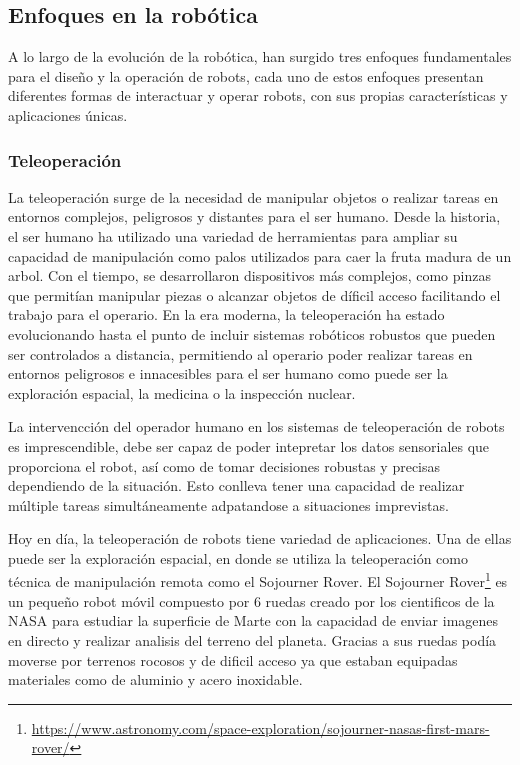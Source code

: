  \subsection{Enfoques en la robótica}
 \label{sec:enfoquesrobotica}
A lo largo de la evolución de la robótica, han surgido tres enfoques fundamentales para el diseño y la operación de robots, cada uno de estos enfoques presentan diferentes
formas de interactuar y operar robots, con sus propias características y aplicaciones únicas. 

\subsubsection{Teleoperación}
\label{sec:subseccion}

La teleoperación surge de la necesidad de manipular objetos o realizar tareas en entornos complejos, peligrosos y distantes para el ser humano. Desde la historia, el ser humano
ha utilizado una variedad de herramientas para ampliar su capacidad de manipulación como palos utilizados para caer la fruta madura de un arbol. Con el tiempo, se desarrollaron 
dispositivos más complejos, como pinzas que permitían manipular piezas o alcanzar objetos de díficil acceso facilitando el trabajo para el operario. En la era moderna, la teleoperación
ha estado evolucionando hasta el punto de incluir sistemas robóticos robustos que pueden ser controlados a distancia, permitiendo al operario poder realizar
tareas en entornos peligrosos e innacesibles para el ser humano como puede ser la exploración espacial, la medicina o la inspección nuclear. \newline

La intervencción del operador humano en los sistemas de teleoperación de robots es imprescendible, debe ser capaz de poder intepretar los datos sensoriales que proporciona el robot, así como de 
tomar decisiones robustas y precisas dependiendo de la situación. Esto conlleva tener una capacidad de realizar múltiple tareas simultáneamente adpatandose a situaciones imprevistas. \newline

Hoy en día, la teleoperación de robots tiene variedad de aplicaciones. Una de ellas puede ser la exploración espacial, en donde se utiliza la teleoperación
como técnica de manipulación remota como el Sojourner Rover. El Sojourner Rover\footnote{\url{https://www.astronomy.com/space-exploration/sojourner-nasas-first-mars-rover/}} 
es un pequeño robot móvil compuesto por 6 ruedas creado por los cientificos de la NASA para estudiar 
la superficie de Marte con la capacidad de enviar imagenes en directo y realizar analisis del terreno del planeta. Gracias a sus ruedas podía moverse por terrenos rocosos y de dificil acceso
ya que estaban equipadas materiales como de aluminio y acero inoxidable. \newline

